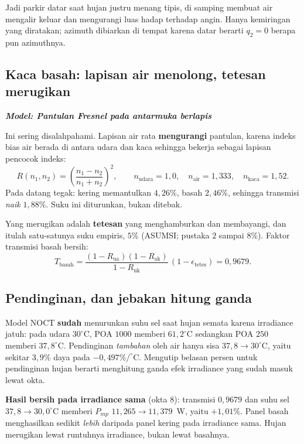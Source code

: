 \documentclass[11pt,a4paper]{article}
\newcommand{\degg}{^\circ}
\newcommand{\model}[1]{\textbf{\textit{Model: #1}}}
\begin{document}
Jadi parkir datar saat hujan justru menang tipis, di samping membuat air mengalir keluar dan mengurangi
luas hadap terhadap angin. Hanya kemiringan yang diratakan; azimuth dibiarkan di tempat karena datar
berarti $q_2 = 0$ berapa pun azimuthnya.

\subsection{Kaca basah: lapisan air menolong, tetesan merugikan}

\model{Pantulan Fresnel pada antarmuka berlapis}

Ini sering disalahpahami. Lapisan air rata \textbf{mengurangi} pantulan, karena indeks bias air berada di
antara udara dan kaca sehingga bekerja sebagai lapisan pencocok indeks:
\begin{equation}
R(n_1,n_2) = \left(\frac{n_1-n_2}{n_1+n_2}\right)^2, \qquad
n_{\mathrm{udara}} = 1{,}0, \quad n_{\mathrm{air}} = 1{,}333, \quad n_{\mathrm{kaca}} = 1{,}52 .
\end{equation}
Pada datang tegak: kering memantulkan $4{,}26\%$, basah $2{,}46\%$, sehingga transmisi \emph{naik}
$1{,}88\%$. Suku ini diturunkan, bukan ditebak.

Yang merugikan adalah \textbf{tetesan} yang menghamburkan dan membayangi, dan itulah satu-satunya suku
empiris, $5\%$ (ASUMSI; pustaka $2$ sampai $8\%$). Faktor transmisi basah bersih:
\begin{equation}
T_{\mathrm{basah}} = \frac{(1-R_{\mathrm{ua}})(1-R_{\mathrm{ak}})}{1-R_{\mathrm{uk}}}\,(1-\epsilon_{\mathrm{tetes}})
= 0{,}9679 .
\end{equation}

\subsection{Pendinginan, dan jebakan hitung ganda}

Model NOCT \textbf{sudah} menurunkan suhu sel saat hujan semata karena irradiance jatuh: pada udara
$30\degg$C, POA $1000$ memberi $61{,}2\degg$C sedangkan POA $250$ memberi $37{,}8\degg$C. Pendinginan
\emph{tambahan} oleh air hanya sisa $37{,}8 \to 30\degg$C, yaitu sekitar $3{,}9\%$ daya pada
$-0{,}497\%/\degg$C. Mengutip belasan persen untuk pendinginan hujan berarti menghitung ganda efek
irradiance yang sudah masuk lewat okta.

\textbf{Hasil bersih pada irradiance sama} (okta 8): transmisi $0{,}9679$ dan suhu sel $37{,}8 \to
30{,}0\degg$C memberi $P_{mp}$ $11{,}265 \to 11{,}379$~W, yaitu $+1{,}01\%$. Panel basah menghasilkan
sedikit \emph{lebih} daripada panel kering pada irradiance sama. Hujan merugikan lewat runtuhnya
irradiance, bukan lewat basahnya.
\end{document}
